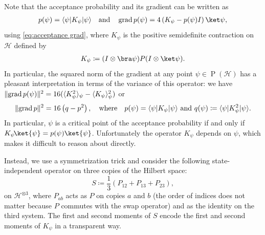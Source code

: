 \documentclass[11pt,a4paper]{article}
\numberwithin{equation}{section}
\newcommand{\ot}{\otimes}
\newcommand{\HH}{\mathcal{H}}
\newcommand{\1}{\mathbf{1}}
\renewcommand{\P}{\operatorname{P}}
\DeclareMathOperator{\grad}{grad}
\DeclarePairedDelimiter\norm{\lVert}{\rVert}
\DeclarePairedDelimiter\ip{\langle}{\rangle}
\begin{document}
Note that the acceptance probability and its gradient can be written as
\begin{align*}
    p(\psi) = \ip{\psi | K_\psi | \psi} \quad\text{and}\quad \grad p(\psi) = 4 \left( K_\psi - p(\psi) I \right) \ket\psi,
\end{align*}
using \cref{eq:acceptance grad},
where $K_\psi$ is the positive semidefinite contraction on $\HH$ defined by
\begin{align*}
    K_\psi \coloneqq (I \ot \bra\psi) P (I \ot \ket\psi).
\end{align*}
In particular, the squared norm of the gradient at any point $\psi \in \P(\HH)$ has a pleasant interpretation in terms of the variance of this operator:
we have $\norm{\grad p(\psi)}^2 = 16 ( \ip{K_\psi^2}_\psi - \ip{K_\psi}_\psi^2 )$ or
\begin{align}\label{eq:grad via p and q}
    \norm{\grad p}^2 = 16 \left( q - p^2 \right),
    \quad\text{where}\quad
    p(\psi) = \ip{\psi | K_\psi | \psi} \text{ and }
    q(\psi) \coloneqq \ip{\psi | K_\psi^2 | \psi}.
\end{align}
In particular, $\psi$ is a critical point of the acceptance probability if and only if $K_\psi \!\ket{\psi} = p(\psi)\ket{\psi}$.
Unfortunately the operator $K_\psi$ depends on $\psi$, which makes it difficult to reason about directly.

Instead, we use a symmetrization trick and consider the following state-independent operator on three copies of the Hilbert space:
\begin{equation}\label{eq:def-S}
    S \coloneqq \frac13 \left( P_{12} + P_{13} + P_{23} \right),
\end{equation}
on $\HH^{\ot 3}$, where $P_{ab}$ acts as $P$ on copies $a$ and $b$ (the order of indices does not matter because $P$ commutes with the swap operator) and as the identity on the third system.
The first and second moments of $S$ encode the first and second moments of $K_\psi$ in a transparent way.
\end{document}
